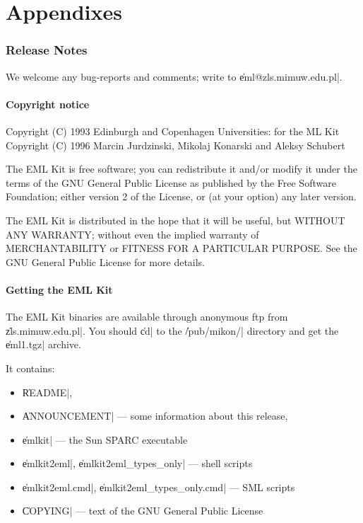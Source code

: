 \part{Appendixes}

\section{Release Notes}
\label{sec:release}

We welcome any bug-reports and comments; write to \|eml@zls.mimuw.edu.pl|.

\subsection{Copyright notice}
\label{sec:copyright}

\begin{center}
Copyright (C) 1993 Edinburgh and Copenhagen Universities: for the ML Kit\\
Copyright (C) 1996 Marcin Jurdzinski, Mikolaj Konarski and Aleksy Schubert
\end{center}

The EML Kit is free software; you can redistribute it and/or modify
it under the terms of the GNU General Public License as published by
the Free Software Foundation; either version 2 of the License, or
(at your option) any later version.

The EML Kit is distributed in the hope that it will be useful,
but WITHOUT ANY WARRANTY; without even the implied warranty of
MERCHANTABILITY or FITNESS FOR A PARTICULAR PURPOSE.  See the
GNU General Public License for more details.

\subsection{Getting the EML Kit}
\label{sec:getting}

The EML Kit binaries are available through
anonymous ftp from \|zls.mimuw.edu.pl|.
You should \|cd| to the \|/pub/mikon/| directory
and get the \|eml1.tgz| archive.

It contains:
\begin{itemize}
\item \|README|,
\item \|ANNOUNCEMENT| --- some information about this release,
\item \|emlkit| --- the Sun SPARC executable
\item \|emlkit2eml|, \|emlkit2eml_types_only| --- shell scripts
\item \|emlkit2eml.cmd|, \|emlkit2eml_types_only.cmd| --- SML scripts
\item \|COPYING| --- text of the GNU General Public License
\end{itemize}

